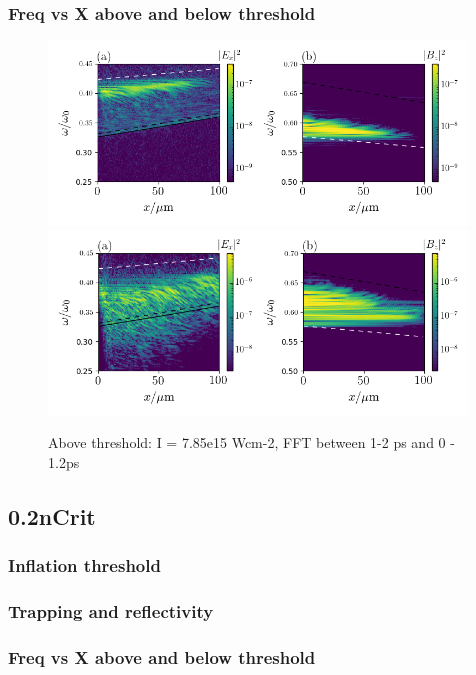 \subsubsection{Freq vs X above and below threshold}
\begin{figure}
    \centering
    \includegraphics[width=0.99\textwidth]{Chapters/C4_iSRS/012_785e15_0_12ps_freqVsX.png}
    \includegraphics[width=0.99\textwidth]{Chapters/C4_iSRS/012_785e15_1_2ps_freqVsX.png}
    \caption{Above threshold: I = 7.85e15 Wcm-2, FFT between 1-2 ps and 0 - 1.2ps}
    \label{fig:012_freqVsX}
\end{figure}{}



\subsection{0.2nCrit}
\subsubsection{Inflation threshold}
\subsubsection{Trapping and reflectivity}
\subsubsection{Freq vs X above and below threshold}
